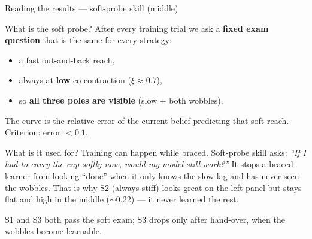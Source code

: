 \documentclass[aspectratio=169, 11pt]{beamer}
\begin{document}
\begin{frame}{Reading the results --- soft-probe skill (middle)}
\begin{block}{What is the soft probe?}
After every training trial we ask a \textbf{fixed exam question} that is the
same for every strategy:
\vspace{2pt}
\begin{itemize}
  \item a fast out-and-back reach,
  \item always at \textbf{low} co-contraction ($\xi\approx0.7$),
  \item so \textbf{all three poles are visible} (slow + both wobbles).
\end{itemize}
The curve is the relative error of the current belief predicting that soft
reach. Criterion: error $<0.1$.
\end{block}
\vspace{4pt}
\begin{block}{What is it used for?}
Training can happen while braced. Soft-probe skill asks:
\emph{``If I had to carry the cup softly now, would my model still work?''}
\vspace{4pt}
It stops a braced learner from looking ``done'' when it only knows the
slow lag and has never seen the wobbles. That is why S2 (always stiff)
looks great on the left panel but stays flat and high in the middle
($\sim$0.22) --- it never learned the rest.
\end{block}
\vspace{2pt}
{\footnotesize S1 and S3 both pass the soft exam; S3 drops only after
hand-over, when the wobbles become learnable.}
\end{frame}
\end{document}
